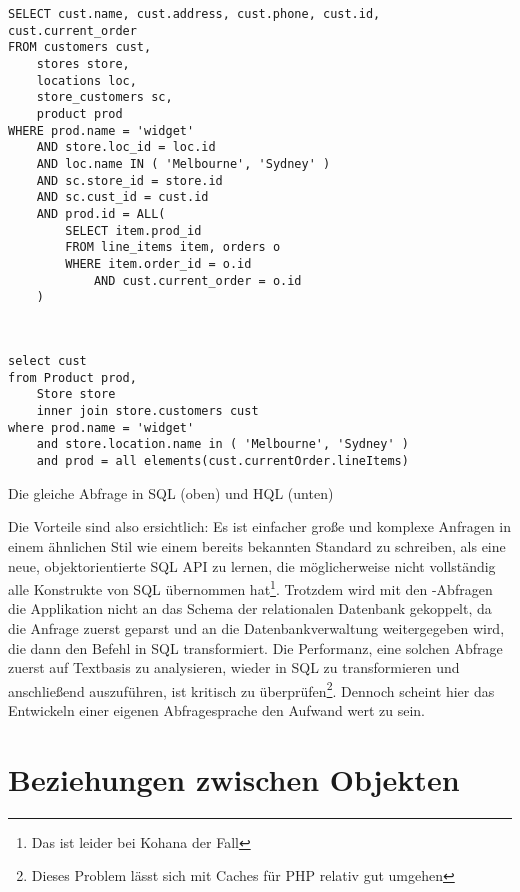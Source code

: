 \begin{fexample} 
\lstset{style=sql}
\begin{lstlisting}
SELECT cust.name, cust.address, cust.phone, cust.id, cust.current_order
FROM customers cust,
    stores store,
    locations loc,
    store_customers sc,
    product prod
WHERE prod.name = 'widget'
    AND store.loc_id = loc.id
    AND loc.name IN ( 'Melbourne', 'Sydney' )
    AND sc.store_id = store.id
    AND sc.cust_id = cust.id
    AND prod.id = ALL(
        SELECT item.prod_id
        FROM line_items item, orders o
        WHERE item.order_id = o.id
            AND cust.current_order = o.id
    )
\end{lstlisting}
\lstset{style=sql}
\begin{lstlisting}


select cust
from Product prod,
    Store store
    inner join store.customers cust
where prod.name = 'widget'
    and store.location.name in ( 'Melbourne', 'Sydney' )
    and prod = all elements(cust.currentOrder.lineItems)
\end{lstlisting}
\caption{Die gleiche Abfrage in SQL (oben) und HQL (unten)}
\label{sql-hql}
\end{fexample}
Die Vorteile sind also ersichtlich: Es ist einfacher große und komplexe Anfragen in einem ähnlichen Stil wie einem bereits bekannten Standard zu schreiben, als eine neue, objekt\-orientierte SQL API zu lernen, die möglicherweise nicht vollständig alle Konstrukte von SQL übernommen hat\footnote{Das ist leider bei Kohana der Fall}. Trotzdem wird mit den -Abfragen die Applikation nicht an das Schema der relationalen Datenbank gekoppelt, da die Anfrage zuerst geparst und an die Datenbankverwaltung weitergegeben wird, die dann den Befehl in SQL transformiert. Die Performanz, eine solchen Abfrage zuerst auf Textbasis zu analysieren, wieder in SQL zu transformieren und anschließend auszuführen, ist kritisch zu überprüfen\footnote{Dieses Problem lässt sich mit Caches für PHP relativ gut umgehen}. Dennoch scheint hier das Entwickeln einer eigenen Abfragesprache den Aufwand wert zu sein.\\

\section{Beziehungen zwischen Objekten}

